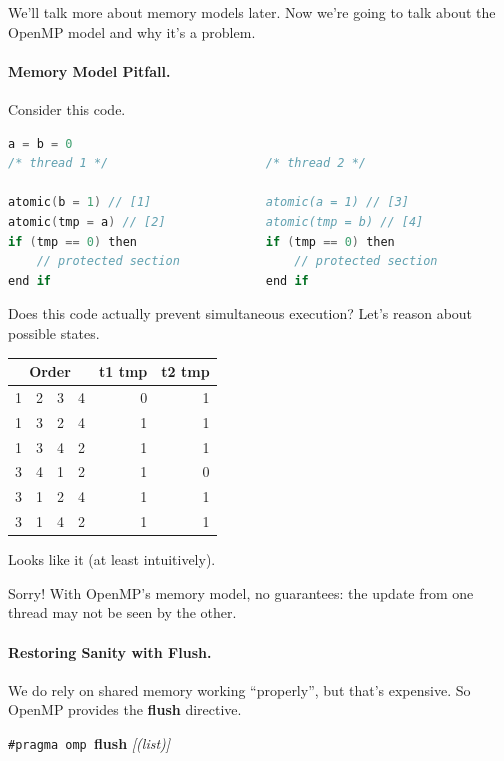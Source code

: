 \documentclass[a4paper]{report}
\begin{document}
We'll talk more about memory models later. Now we're going to talk about 
the OpenMP model and why it's a problem.

\paragraph{Memory Model Pitfall.} Consider this code.

  \begin{lstlisting}[language=C]
                    a = b = 0
/* thread 1 */                      /* thread 2 */

atomic(b = 1) // [1]                atomic(a = 1) // [3]
atomic(tmp = a) // [2]              atomic(tmp = b) // [4]
if (tmp == 0) then                  if (tmp == 0) then
    // protected section                // protected section
end if                              end if
  \end{lstlisting}

Does this code actually prevent simultaneous execution?
Let's reason about possible states.

  \begin{center}
  \begin{tabular}{r r r r | r r}
    \multicolumn{4}{c|}{Order} & t1 tmp & t2 tmp\\
    \hline
    1 & 2 & 3 & 4 & 0 & 1\\
    1 & 3 & 2 & 4 & 1 & 1\\
    1 & 3 & 4 & 2 & 1 & 1\\
    3 & 4 & 1 & 2 & 1 & 0\\
    3 & 1 & 2 & 4 & 1 & 1\\
    3 & 1 & 4 & 2 & 1 & 1\\
  \end{tabular}
  \end{center}

Looks like it (at least intuitively).

Sorry! With OpenMP's memory model, no guarantees:
the update from one thread may not be seen by the other.

\paragraph{Restoring Sanity with Flush.} We do rely on 
shared memory working ``properly'', but that's expensive.
So OpenMP provides the {\bf flush} directive.

  \begin{center}
    {\tt \#pragma omp }{\bf flush} {\it[(list)]}
  \end{center}
\end{document}
